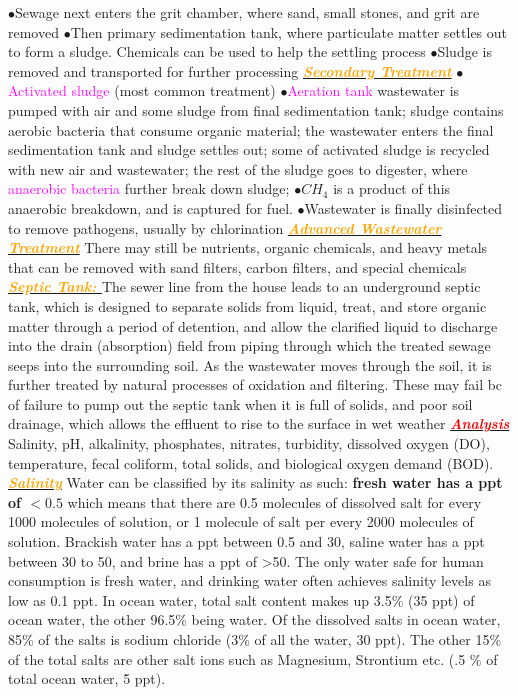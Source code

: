 \documentclass{article}
\newcommand{\ddd}{$\bullet$}
\newcommand{\red}[1]{\textcolor{red}{#1}}
\newcommand{\pink}[1]{\textcolor{magenta}{#1}}
\newcommand{\orange}[1]{\textcolor{orange}{#1}}
\newcommand{\mysection}[1]{\underline{{\textbf{\textit{\red{#1}}}}}}
\newcommand{\mysubsection}[1]{\underline{\textbf{{\textit{\orange{#1}}}}}}
\newcommand{\vocab}[1]{{\pink{#1}}}
\begin{document}
\begin{multicols*}{4}
            \ddd Sewage next enters the grit chamber, where sand, small stones, and grit are removed
            \ddd Then primary sedimentation tank, where particulate matter settles out to form a sludge. Chemicals can be used to help the settling process
            \ddd Sludge is removed and transported for further processing
    	 \mysubsection{Secondary Treatment}
    	    \ddd \vocab{Activated sludge} (most common treatment)
    	    \ddd \vocab{Aeration tank} wastewater is pumped with air and some sludge from final sedimentation tank; sludge contains aerobic bacteria that consume organic material; the wastewater enters the final sedimentation tank and sludge settles out; some of activated sludge is recycled with new air and wastewater; the rest of the sludge goes to digester, where \vocab{anaerobic bacteria} further break down sludge;
    	    \ddd $CH_4$ is a product of this anaerobic breakdown, and is captured for fuel. 
    	    \ddd Wastewater is finally disinfected to remove pathogens, usually by chlorination
    	  \mysubsection{Advanced Wastewater Treatment}
    	    There may still be nutrients, organic chemicals, and heavy metals that can be removed with sand filters, carbon filters, and special chemicals        
        \mysubsection{Septic Tank: } 
        	The sewer line from the house leads to an underground septic tank, which is designed to separate solids from liquid, treat, and store organic matter through a period of detention, and allow the clarified liquid to discharge into the drain (absorption) field from piping through which the treated sewage seeps into the surrounding soil. As the wastewater moves through the soil, it is further treated by natural processes of oxidation and filtering. These may fail bc of failure to pump out the septic tank when it is full of solids, and poor soil drainage, which allows the effluent to rise to the surface in wet weather
    \mysection{Analysis}
        Salinity, pH, alkalinity, phosphates, nitrates, turbidity, dissolved oxygen (DO), temperature, fecal coliform, total solids, and biological oxygen demand (BOD). 
        \mysubsection{Salinity}
            Water can be classified by its salinity as such: \textbf{fresh water has a ppt of $< 0.5$} which means that there are 0.5 molecules of dissolved salt for every 1000 molecules of solution, or 1 molecule of salt per every 2000 molecules of solution. Brackish water has a ppt between 0.5 and 30, saline water has a ppt between 30 to 50, and brine has a ppt of >50. The only water safe for human consumption is fresh water, and drinking water often achieves salinity levels as low as 0.1 ppt. In ocean water, total salt content makes up 3.5\% (35 ppt) of ocean water, the other 96.5\% being water. Of the dissolved salts in ocean water, 85\% of the salts is sodium chloride (3\% of all the water, 30 ppt). The other 15\% of the total salts are other salt ions such as Magnesium, Strontium etc. (.5 \% of total ocean water, 5 ppt). 

\end{multicols*}
\end{document}
